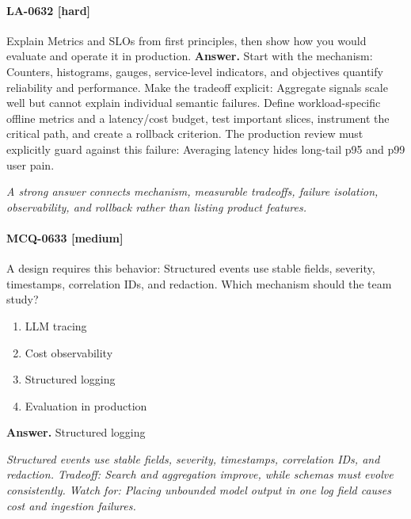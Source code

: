 \paragraph{LA-0632 [hard]} Explain Metrics and SLOs from first principles, then show how you would evaluate and operate it in production.
\noindent\textbf{Answer.} Start with the mechanism: Counters, histograms, gauges, service-level indicators, and objectives quantify reliability and performance. Make the tradeoff explicit: Aggregate signals scale well but cannot explain individual semantic failures. Define workload-specific offline metrics and a latency/cost budget, test important slices, instrument the critical path, and create a rollback criterion. The production review must explicitly guard against this failure: Averaging latency hides long-tail p95 and p99 user pain.
\par\textit{A strong answer connects mechanism, measurable tradeoffs, failure isolation, observability, and rollback rather than listing product features.}
\paragraph{MCQ-0633 [medium]} A design requires this behavior: Structured events use stable fields, severity, timestamps, correlation IDs, and redaction. Which mechanism should the team study?
\begin{enumerate}[label=\Alph*.]
\item LLM tracing
\item Cost observability
\item Structured logging
\item Evaluation in production
\end{enumerate}
\noindent\textbf{Answer.} Structured logging
\par\textit{Structured events use stable fields, severity, timestamps, correlation IDs, and redaction. Tradeoff: Search and aggregation improve, while schemas must evolve consistently. Watch for: Placing unbounded model output in one log field causes cost and ingestion failures.}

